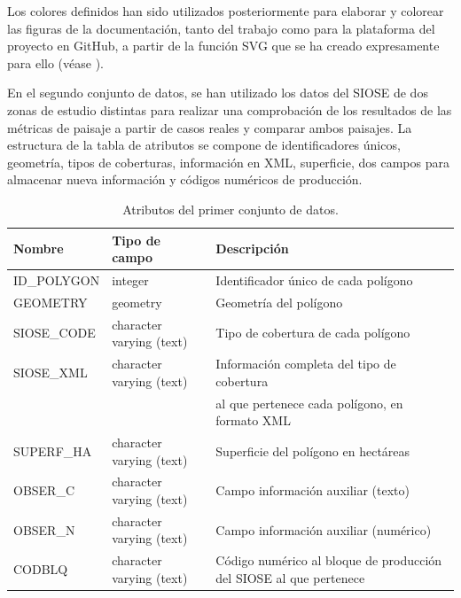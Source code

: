 Los colores definidos han sido utilizados posteriormente para elaborar y colorear las figuras de la documentación, tanto del trabajo como para la plataforma del proyecto en GitHub, a partir de la función SVG que se ha creado expresamente para ello (véase \label{sec:Documentación de la extensión}).

En el segundo conjunto de datos, se han utilizado los datos del SIOSE de dos zonas de estudio distintas para realizar una comprobación de los resultados de las métricas de paisaje a partir de casos reales y comparar ambos paisajes. La estructura de la tabla de atributos se compone de identificadores únicos, geometría, tipos de coberturas, información en XML, superficie, dos campos para almacenar nueva información y códigos numéricos de producción.

\begin{table}[]
\centering
\caption{Atributos del primer conjunto de datos.}
\label{my-label}
\begin{tabular}{@{}lll@{}}
\toprule
\textbf{Nombre} & \textbf{Tipo de campo}   & \textbf{Descripción}                    \\ \midrule
ID\_POLYGON      & integer                  & Identificador único de cada polígono    \\
GEOMETRY        & geometry                 & Geometría del polígono                  \\
SIOSE\_CODE      & character varying (text) & Tipo de cobertura de cada polígono \\
SIOSE\_XML       & character varying (text) & Información completa del tipo de cobertura \\
& & al que pertenece cada polígono, en formato XML \\


SUPERF\_HA       & character varying (text) & Superficie del polígono en hectáreas \\
OBSER\_C         & character varying (text) & Campo información auxiliar (texto) \\
OBSER\_N         & character varying (text) & Campo información auxiliar (numérico) \\
CODBLQ          & character varying (text) & Código numérico al bloque de producción del SIOSE al que pertenece   \\ \bottomrule
\end{tabular}
\end{table}




